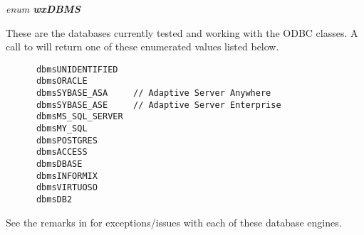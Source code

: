 

{\it enum {\bf wxDBMS}}

These are the databases currently tested and working with the ODBC classes.  A call to  will return one of these enumerated values listed below.

\begin{verbatim}
      dbmsUNIDENTIFIED
      dbmsORACLE
      dbmsSYBASE_ASA     // Adaptive Server Anywhere
      dbmsSYBASE_ASE     // Adaptive Server Enterprise
      dbmsMS_SQL_SERVER
      dbmsMY_SQL
      dbmsPOSTGRES
      dbmsACCESS
      dbmsDBASE
      dbmsINFORMIX
      dbmsVIRTUOSO
      dbmsDB2
\end{verbatim}

See the remarks in  for exceptions/issues with each of these database engines.




